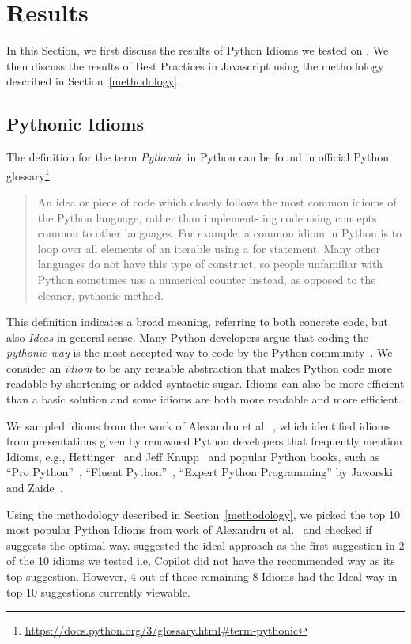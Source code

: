 \section{Results}
In this Section, we first discuss the results of Python Idioms we tested on \cop{}. We then discuss the results of Best Practices in Javascript using the methodology described in Section~\ref{methodology}.

\subsection{Pythonic Idioms}
\label{secidioms}
The definition for the term \emph{Pythonic} in Python can be found in official Python glossary\footnote{\url{https://docs.python.org/3/glossary.html\#term-pythonic}}:

\begin{quote}
    An idea or piece of code which closely follows the most common idioms of the Python language, rather than implement- ing code using concepts common to other languages. For example, a common idiom in Python is to loop over all elements of an iterable using a for statement. Many other languages do not have this type of construct, so people unfamiliar with Python sometimes use a numerical counter instead, as opposed to the cleaner, pythonic method.
\end{quote}

This definition indicates a broad meaning, referring to both concrete code, but also \emph{Ideas} in general sense. Many Python developers argue that coding the \emph{pythonic way} is the most accepted way to code by the Python community~\cite{Alexandru2018}. We consider an \emph{idiom} to be any reusable abstraction that makes Python code more readable by shortening or added syntactic sugar. Idioms can also be more efficient than a basic solution and some idioms are both more readable and more efficient.

We sampled idioms from the work of Alexandru et al.~\cite{Alexandru2018}, which identified idioms from presentations given by renowned Python developers that frequently mention Idioms, e.g., Hettinger~\cite{hettinger} and Jeff Knupp~\cite{knupp} and popular Python books, such as ``Pro Python''~\cite{Alchin2010}, ``Fluent Python''~\cite{fluent}, ``Expert Python Programming'' by Jaworski and Zaide~\cite{expert}.

Using the methodology described in Section~\ref{methodology}, we picked the top 10 most popular Python Idioms from work of Alexandru et al.~\cite{Alexandru2018} and checked if \cop{} suggests the optimal way. \cop{} suggested the ideal approach as the first suggestion in 2 of the 10 idioms we tested i.e, Copilot did not have the recommended way as its top suggestion. However, 4 out of those remaining 8 Idioms had the Ideal way in \cop{} top 10 suggestions currently viewable. 


